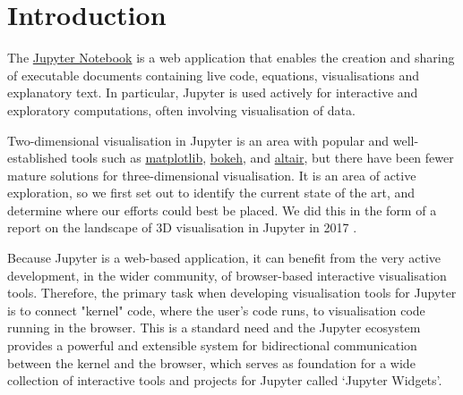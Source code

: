 \documentclass{deliverablereport}
\author{Benjamin Ragan-Kelley, Vidar Tonaas Fauske, Marcin Kostur}
\begin{document}
\maketitle
\tableofcontents



\section{Introduction}

The \href{https://jupyter.org}{Jupyter Notebook} is a web application
that enables the creation and sharing of executable documents
containing live code, equations, visualisations and explanatory text.
In particular, Jupyter is used actively for interactive and exploratory computations,
often involving visualisation of data.

Two-dimensional visualisation in Jupyter is an area with popular and well-established tools
such as \href{https://matplotlib.org}{matplotlib}, \href{https://bokeh.pydata.org/}{bokeh}, and \href{https://altair-viz.github.io}{altair},
but there have been fewer mature solutions for three-dimensional visualisation.
It is an area of active exploration,
so we first set out to identify the current state of the art,
and determine where our efforts could best be placed.
We did this in the form of a report on the landscape of 3D
visualisation in Jupyter in 2017 .


Because Jupyter is a web-based application, it can benefit from the
very active development, in the wider community, of browser-based
interactive visualisation tools. Therefore, the primary task when
developing visualisation tools for Jupyter is to connect "kernel"
code, where the user's code runs, to visualisation code running in the
browser. This is a standard need and the Jupyter ecosystem provides a
powerful and extensible system for bidirectional communication between
the kernel and the browser, which serves as foundation for a wide
collection of interactive tools and projects for Jupyter called
`Jupyter Widgets'.
\end{document}

